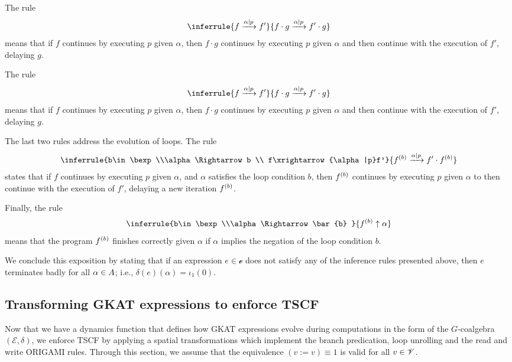 The rule
\begin{align}
    \inferrule
    {f\xrightarrow{\alpha|p} f' }
    {f\cdot g\xrightarrow{\alpha|p} f'\cdot g}    
\end{align}
means that if $f$ continues by executing $p$ given $\alpha$, then $f\cdot g$ continues by executing $p$ given $\alpha$ and then continue with the execution of $f'$, delaying $g$.

The rule 
\begin{align}
    \inferrule
    {f\xrightarrow{\alpha|p} f' }
    {f\cdot g\xrightarrow{\alpha|p} f'\cdot g}    
\end{align}
means that if $f$ continues by executing $p$ given $\alpha$, then $f\cdot g$ continues by executing $p$ given $\alpha$ and then continue with the execution of $f'$, delaying $g$.

The last two rules address the evolution of loops. The rule
\begin{align}
    \inferrule
    {b\in \bexp \\\alpha \Rightarrow b \\ f\xrightarrow{\alpha|p}f'}
    {\iterate{b}{f}\xrightarrow{\alpha|p}f'\cdot \iterate{b}{f}}    
\end{align}
states that if $f$ continues by executing $p$ given $\alpha$, and $\alpha$ satisfies the loop condition $b$, then $\iterate{b}{f}$ continues by executing $p$ given $\alpha$ to then continue with the execution of $f'$, delaying a new iteration $\iterate{b}{f}$.

Finally, the rule 
\begin{align}
    \inferrule
    {b\in \bexp \\\alpha \Rightarrow \bar{b} }
    {\iterate{b}{f}\uparrow \alpha}    
\end{align}
means that the program $\iterate{b}{f}$ finishes correctly given $\alpha$ if $\alpha$ implies the negation of the loop condition $b$. 

We conclude this exposition by stating that if an expression $e\in \mathscr{e}$ does not satisfy any of the inference rules presented above, then $e$ terminates badly for all $\alpha\in \Atom$; i.e., $\delta(e)(\alpha)=\iota_1(0)$. 

\subsection{Transforming GKAT expressions to enforce TSCF}
\label{sec:SideChannels:SpatialTransformations}
Now that we have a dynamics function that defines how GKAT expressions evolve during computations in the form of the $G$-coalgebra $(\mathscr{E},\delta)$, we enforce TSCF by applying a spatial transformations which implement the branch predication, loop unrolling and the read and write ORIGAMI rules. Through this section, we assume that the equivalence $(v:=v)\equiv 1$ is valid for all $v\in\Variable$.

